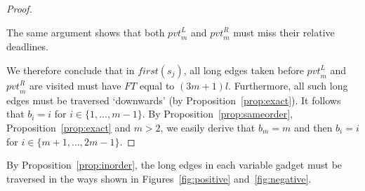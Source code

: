 \documentclass[envcountsame]{llncs}
\begin{document}
\begin{proof}
\begin{itemize}
The same argument shows that both $\mathit{pvt}_m^L$ and $\mathit{pvt}_m^R$ must miss their relative deadlines.
\end{itemize}
We therefore conclude that in $\mathit{first}(s_j)$, all long edges taken before $\mathit{pvt}_m^L$ and $\mathit{pvt}_m^R$ are visited
must have $FT$ equal to $(3m+1)l$.
Furthermore, all such long edges must be traversed `downwards' (by Proposition~\ref{prop:exact}).
It follows that $b_i = i$ for $i \in \{1, \ldots, m - 1\}$.
By Proposition~\ref{prop:sameorder}, Proposition~\ref{prop:exact} and $m > 2$, we easily derive that $b_m = m$
and then $b_i = i$ for $i \in \{m + 1, \ldots, 2m - 1\}$.
\end{proof}

By Proposition~\ref{prop:inorder}, the long edges in each variable
gadget must be traversed in the ways shown in Figures~\ref{fig:positive} and~\ref{fig:negative}.
\end{document}
